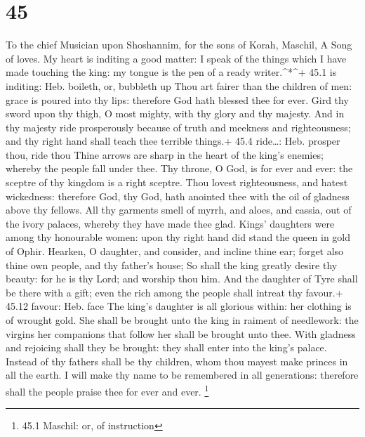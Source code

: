 \hypertarget{section-44}{%
\section{45}\label{section-44}}

To the chief Musician upon Shoshannim, for the sons of Korah, Maschil, A
Song of loves.  My heart is inditing a good matter: I speak
of the things which I have made touching the king: my tongue is the pen
of a ready writer.\^{}*\^{}+ 45.1 is inditing: Heb. boileth, or,
bubbleth up  Thou art fairer than the children of men: grace
is poured into thy lips: therefore God hath blessed thee for ever.
 Gird thy sword upon thy thigh, O most mighty, with thy
glory and thy majesty.  And in thy majesty ride prosperously
because of truth and meekness and righteousness; and thy right hand
shall teach thee terrible things.+ 45.4 ride\ldots: Heb. prosper thou,
ride thou  Thine arrows are sharp in the heart of the king's
enemies; whereby the people fall under thee.  Thy throne, O
God, is for ever and ever: the sceptre of thy kingdom is a right
sceptre.  Thou lovest righteousness, and hatest wickedness:
therefore God, thy God, hath anointed thee with the oil of gladness
above thy fellows.  All thy garments smell of myrrh, and
aloes, and cassia, out of the ivory palaces, whereby they have made thee
glad.  Kings' daughters were among thy honourable women:
upon thy right hand did stand the queen in gold of Ophir. 
Hearken, O daughter, and consider, and incline thine ear; forget also
thine own people, and thy father's house;  So shall the
king greatly desire thy beauty: for he is thy Lord; and worship thou
him.  And the daughter of Tyre shall be there with a gift;
even the rich among the people shall intreat thy favour.+ 45.12 favour:
Heb. face  The king's daughter is all glorious within: her
clothing is of wrought gold.  She shall be brought unto the
king in raiment of needlework: the virgins her companions that follow
her shall be brought unto thee.  With gladness and
rejoicing shall they be brought: they shall enter into the king's
palace.  Instead of thy fathers shall be thy children, whom
thou mayest make princes in all the earth.  I will make thy
name to be remembered in all generations: therefore shall the people
praise thee for ever and ever. \footnote{45.1 Maschil: or, of
  instruction}

